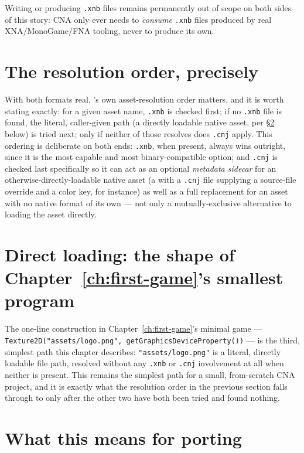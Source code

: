 Writing or producing \texttt{.xnb} files remains permanently out of scope on both sides of
this story: CNA only ever needs to \emph{consume} \texttt{.xnb} files produced by real
XNA/MonoGame/FNA tooling, never to produce its own.

\section{The resolution order, precisely}

With both formats real, 's own asset-resolution order matters, and
it is worth stating exactly: for a given asset name, \texttt{.xnb} is checked first; if no
\texttt{.xnb} file is found, the literal, caller-given path (a directly loadable native
asset, per \S\ref{sec:direct-loading} below) is tried next; only if neither of those resolves
does \texttt{.cnj} apply. This ordering is deliberate on both ends: \texttt{.xnb}, when
present, always wins outright, since it is the most capable and most binary-compatible
option; and \texttt{.cnj} is checked last specifically so it can act as an optional
\emph{metadata sidecar} for an otherwise-directly-loadable native asset (a 
with a \texttt{.cnj} file supplying a source-file override and a color key, for instance) as
well as a full replacement for an asset with no native format of its own --- not only a
mutually-exclusive alternative to loading the asset directly.

\section{Direct loading: the shape of Chapter~\ref{ch:first-game}'s smallest program}
\label{sec:direct-loading}

The one-line construction in Chapter~\ref{ch:first-game}'s minimal game ---
\texttt{Texture2D("assets/logo.png", getGraphicsDeviceProperty())} --- is the third, simplest
path this chapter describes: \texttt{"assets/logo.png"} is a literal, directly loadable file
path, resolved without any \texttt{.xnb} or \texttt{.cnj} involvement at all when neither is
present. This remains the simplest path for a small, from-scratch CNA project, and it is
exactly what the resolution order in the previous section falls through to only after the
other two have both been tried and found nothing.

\section{What this means for porting}


